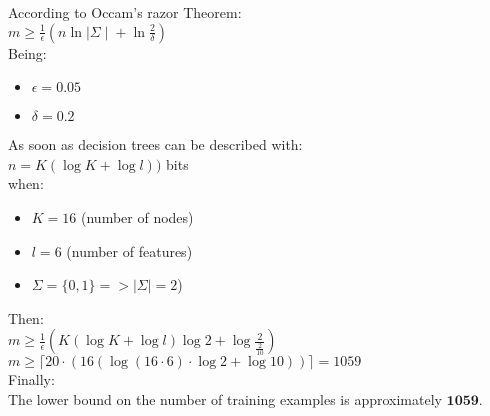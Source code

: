 According to Occam's razor Theorem:
\\
\bigbreak
$ m \geq \frac{1}{\epsilon} (n\ln{\mid \Sigma \mid}+\ln{\frac{2}{\delta}})$
\\
\bigbreak
Being:
\begin{itemize}
	\item $\epsilon = 0.05$
	\item $\delta = 0.2$
\end{itemize}
As soon as decision trees can be described with:\\
$n = K(\log{K}+\log{l}))$ bits\\
\bigbreak
when:
\begin{itemize}
	\item $K = 16$ (number of nodes)
	\item $l = 6$ (number of features)
	\item $\Sigma = \{0,1\} => \mid \Sigma \mid = 2$)
\end{itemize}
Then:\\
\bigbreak
	$m \geq \frac{1}{\epsilon} (K(\log{K}+\log{l})\log{2}+\log{\frac{2}{\frac{2}{10}}})$\\
	\bigbreak
	$ m \geq \lceil 20\cdot (16(\log{(16\cdot 6)}\cdot \log{2}+\log{10})) \rceil = 1059 $\\
	\bigbreak
Finally:\\
The lower bound on the number of training examples is approximately $\textbf{1059}$. 
